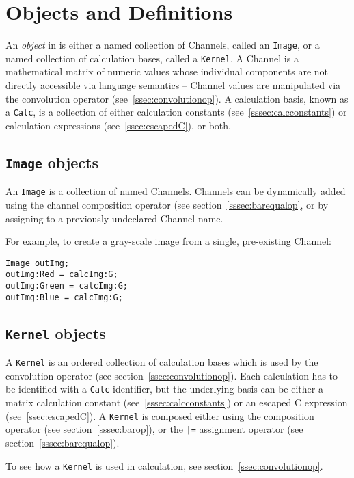 \section{Objects and Definitions}
\label{sec:objdef}
An \emph{object} in \sys{} is either a named collection of Channels, called an
\texttt{Image}, or a named collection of calculation bases, called a
\texttt{Kernel}. A Channel is a mathematical matrix of numeric values
whose individual components are not directly accessible via \sys{} language
semantics -- Channel values are manipulated via the convolution
operator (see~\ref{ssec:convolutionop}). A calculation basis, known as a
\texttt{Calc}, is a collection of either calculation constants
(see~\ref{sssec:calcconstants}) or calculation expressions (see~\ref{ssec:escapedC}),
or both.

\subsection{\texttt{Image} objects}
\label{ssec:images}
An \texttt{Image} is a collection of named Channels. Channels can
be dynamically added  using the channel composition
operator (see section~\ref{sssec:barequalop}, or by assigning to a previously
undeclared Channel name. 

For example, to create a gray-scale image from a single, pre-existing
Channel:
\begin{lstlisting}[language=CLAM,escapechar=\%]
Image outImg;
outImg:Red = calcImg:G;
outImg:Green = calcImg:G;
outImg:Blue = calcImg:G;
\end{lstlisting}

\subsection{\texttt{Kernel} objects}
\label{ssec:kernels}
A \texttt{Kernel} is an ordered collection of calculation bases which is used by the convolution
operator (see section~\ref{ssec:convolutionop}). Each calculation has to be identified with a \texttt{Calc}
identifier, but the underlying basis can be either
a matrix calculation constant (see~\ref{sssec:calcconstants}) or an escaped C expression
(see~\ref{ssec:escapedC}). A \texttt{Kernel} is composed either using the composition
operator (see section~\ref{sssec:barop}), or the \texttt{|=} assignment operator (see section~\ref{sssec:barequalop}).

To see how a \texttt{Kernel} is used in calculation, see section~\ref{ssec:convolutionop}.
